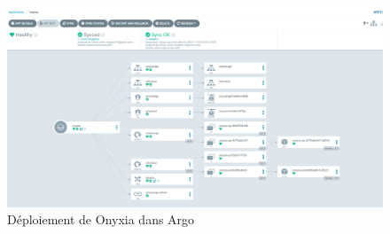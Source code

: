 \documentclass[11pt,fleqn]{book} %
\begin{document}
\begin{figure}[H]
\renewcommand{\figurename}{Capture d'écran}
\hspace{-2.5cm}
\includegraphics[scale=0.5,trim={0 0 5cm 0},clip]{Pictures/CI-CD/Onyxia-argo.PNG}
\captionsetup{margin=1.5cm,format=hang,justification=justified}
\caption[]{Déploiement de Onyxia dans Argo \newline}
\end{figure}
 
\end{document}
